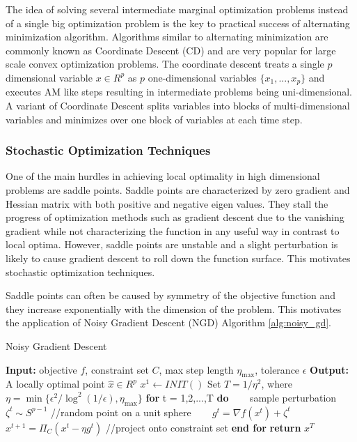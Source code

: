 The idea of solving several intermediate marginal optimization problems instead of a single big optimization problem is the key to practical success of alternating minimization algorithm. Algorithms similar to alternating minimization are commonly known as Coordinate Descent (CD) and are very popular for large scale convex optimization problems. The coordinate descent treats a single $p$ dimensional variable $x \in R^{p}$ as $p$ one-dimensional variables $\{x_1,...,x_p\}$ and executes AM like steps resulting in intermediate problems being uni-dimensional. A variant of Coordinate Descent splits variables into blocks of multi-dimensional variables and minimizes over one block of variables at each time step. 

\subsubsection{Stochastic Optimization Techniques}

One of the main hurdles in achieving local optimality in high dimensional problems are saddle points. Saddle points are characterized by zero gradient and Hessian matrix with both positive and negative eigen values. They stall the progress of optimization methods such as gradient descent due to the vanishing gradient while not characterizing the function in any useful way in contrast to local optima. However, saddle points are unstable and a slight perturbation is likely to cause gradient descent to roll down the function surface. This motivates stochastic optimization techniques.

Saddle points can often be caused by symmetry of the objective function and they increase exponentially with the dimension of the problem. This motivates the application of Noisy Gradient Descent (NGD) Algorithm \ref{alg:noisy_gd}.

\begin{algorithm}
\caption{Noisy Gradient Descent}
\label{alg:noisy_gd}
\begin{algorithmic}[1]
\STATE \textbf{Input:} objective $f$, constraint set $C$, max step length $\eta_{\max}$, tolerance $\epsilon$
\STATE \textbf{Output:} A locally optimal point $\hat{x} \in R^{p}$ 
\STATE $x^{1} \leftarrow INIT()$
\STATE Set $T = 1/\eta^{2}$, where $\eta = \min\{\epsilon^{2}/\log^{2}(1/\epsilon),\eta_{\max}\}$
\STATE \textbf{for} t = 1,2,...,T \textbf{do}
\STATE ~~~ sample perturbation $\zeta^{t} \sim S^{p-1}$ //random point on a unit sphere
\STATE ~~~ $g^{t} = \nabla f(x^{t}) + \zeta^{t}$
\STATE ~~~ $x^{t+1} = \Pi_{C}(x^{t} - \eta g^{t})$ //project onto constraint set
\STATE \textbf{end for}
\STATE \textbf{return} $x^{T}$
\end{algorithmic}
\end{algorithm}

